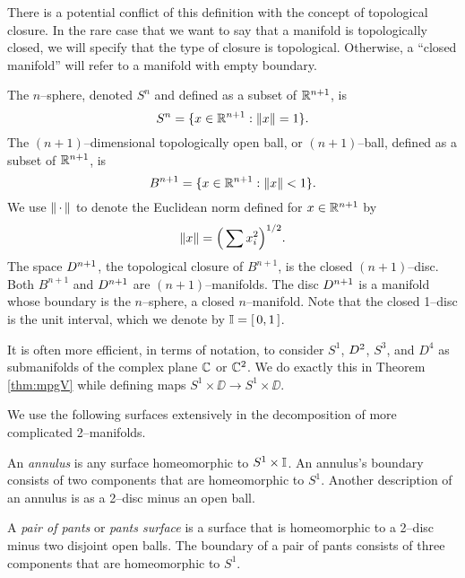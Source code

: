 There is a potential conflict of this definition with the concept of topological closure.
In the rare case that we want to say that a manifold is topologically closed, we will specify that the type of closure is topological.
Otherwise, a ``closed manifold'' will refer to a manifold with empty boundary.

\begin{ex}
	The $n$--sphere, denoted $S^n$ and defined as a subset of $\mathbb{R}^{n+1}$, is
	\[
	S^n = \{x\in\mathbb{R}^{n+1}:\left\lVert x \right\rVert=1\}.
	\]
	The $(n+1)$--dimensional topologically open ball, or $(n+1)$--ball, defined as a subset of $\mathbb{R}^{n+1}$, is
	\[
	B^{n+1} = \{x\in\mathbb{R}^{n+1}:\left\lVert x \right\rVert< 1\}.
	\]
	We use $\left\lVert \,\cdot\, \right\rVert$ to denote the Euclidean norm defined for $x\in\mathbb{R}^{n+1}$ by
	\[
	\left\lVert x \right\rVert = \Big( \sum x_i^2 \Big)^{1/2}.
	\]
	The space $D^{n+1}$, the topological closure of $B^{n+1}$, is the closed $(n+1)$--disc.
	Both $B^{n+1}$ and $D^{n+1}$ are $(n+1)$--manifolds.
	The disc $D^{n+1}$ is a manifold whose boundary is the $n$--sphere, a closed $n$--manifold.
	Note that the closed 1--disc is the unit interval, which we denote by $\mathbb{I}=[\,0,1\,]$.
	
	It is often more efficient, in terms of notation, to consider $S^1$, $D^2$, $S^3$, and $D^4$ as submanifolds of the complex plane $\mathbb{C}$ or $\mathbb{C}^2$.
	We do exactly this in Theorem \ref{thm:mpgV} while defining maps $S^1\times\DD\to S^1\times\DD$.
\end{ex}

We use the following surfaces extensively in the decomposition of more complicated 2--manifolds.

\begin{defn}
	\label{def:annulus}
	An \emph{annulus} is any surface homeomorphic to $S^1\times\mathbb{I}$.
	An annulus's boundary consists of two components that are homeomorphic to $S^1$.
	Another description of an annulus is as a 2--disc minus an open ball.
\end{defn}

\begin{defn}
	\label{def:pants}
	A \emph{pair of pants} or \emph{pants surface} is a surface that is homeomorphic to a 2--disc minus two disjoint open balls.
	The boundary of a pair of pants consists of three components that are homeomorphic to $S^1$.
\end{defn}

